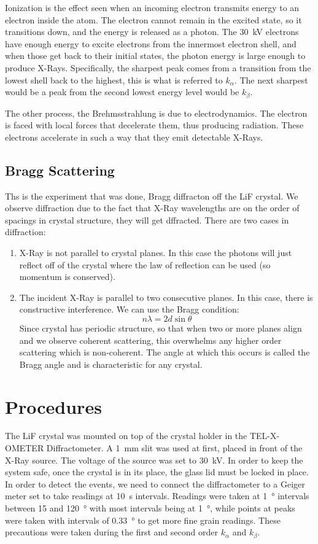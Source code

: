 \documentclass[letterpaper,12pt]{article}
\begin{document}
Ionization is the effect seen when an incoming electron transmits energy to an electron inside the atom. The electron cannot remain in the excited state, so it transitions down, and the energy is released as a photon. The \SI{30}{\kV} electrons have enough energy to excite electrons from the innermost electron shell, and when those get back to their initial states, the photon energy is large enough to produce X-Rays. Specifically, the sharpest peak comes from a transition from the lowest shell back to the highest, this is what is referred to $k_\alpha$. The next sharpest would be a peak from the second lowest energy level would be $k_\beta$.

The other process, the Brehmsstrahlung is due to electrodynamics. The electron is faced with local forces that decelerate them, thus producing radiation. These electrons accelerate in such a way that they emit detectable X-Rays.
\subsection{Bragg Scattering}
Ths is the experiment that was done, Bragg diffracton off the LiF crystal. We observe diffraction due to the fact that X-Ray wavelengths are on the order of spacings in crystal structure, they will get dffracted. There are two cases in diffraction:
\begin{enumerate}
\item X-Ray is not parallel to crystal planes. In this case the photons will just reflect off of the crystal where the law of reflection can be used (so momentum is conserved).
\item The incident X-Ray is parallel to two consecutive planes. In this case, there is constructive interference. We can use the Bragg condition:
  \begin{equation}\label{eq:bragg}
    n\lambda=2d\sin\theta
  \end{equation}
  Since crystal has periodic structure, so that when two or more planes align and we observe coherent scattering, this overwhelms any higher order scattering which is non-coherent. The angle at which this occurs is called the Bragg angle and is characteristic for any crystal.  
\end{enumerate}
\section{Procedures}
The LiF crystal was mounted on top of the crystal holder in the TEL-X-OMETER Diffractometer. A \SI{1}{\milli\meter} slit was used at first, placed in front of the X-Ray source. The voltage of the source was set to \SI{30}{\kV}. In order to keep the system safe, once the crystal is in its place, the glass lid must be locked in place. In order to detect the events, we need to connect the diffractometer to a Geiger meter set to take readings at \SI{10}{\second} intervals. Readings were taken at \SI{1}{\degree} intervals between 15 and \SI{120}{\degree} with most intervals being at \SI{1}{\degree}, while points at peaks were taken with intervals of \SI{0.33}{\degree} to get more fine grain readings. These precautions were taken during the first and second order $k_\alpha$ and $k_\beta$.
\end{document}
